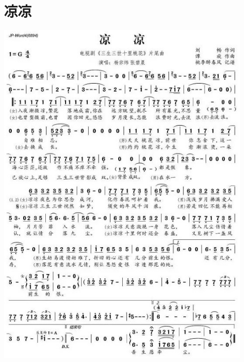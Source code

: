 \documentclass[cn,pad,twocol]{elegantbook}
\begin{document}
\section{凉凉}\includegraphics[width=0.95\textwidth]{dongxiao/20200819/凉凉.jpeg}
\end{document}
